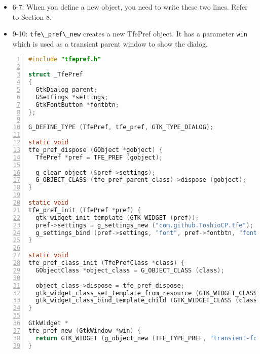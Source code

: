 \begin{itemize}
\tightlist
\item
  6-7: When you define a new object, you need to write these two lines.
  Refer to Section 8.
\item
  9-10: \passthrough{\lstinline!tfe\_pref\_new!} creates a new TfePref
  object. It has a parameter \passthrough{\lstinline!win!} which is used
  as a transient parent window to show the dialog.
\end{itemize}

\begin{lstlisting}[language=C, numbers=left]
#include "tfepref.h"

struct _TfePref
{
  GtkDialog parent;
  GSettings *settings;
  GtkFontButton *fontbtn;
};

G_DEFINE_TYPE (TfePref, tfe_pref, GTK_TYPE_DIALOG);

static void
tfe_pref_dispose (GObject *gobject) {
  TfePref *pref = TFE_PREF (gobject);

  g_clear_object (&pref->settings);
  G_OBJECT_CLASS (tfe_pref_parent_class)->dispose (gobject);
}

static void
tfe_pref_init (TfePref *pref) {
  gtk_widget_init_template (GTK_WIDGET (pref));
  pref->settings = g_settings_new ("com.github.ToshioCP.tfe");
  g_settings_bind (pref->settings, "font", pref->fontbtn, "font", G_SETTINGS_BIND_DEFAULT);
}

static void
tfe_pref_class_init (TfePrefClass *class) {
  GObjectClass *object_class = G_OBJECT_CLASS (class);

  object_class->dispose = tfe_pref_dispose;
  gtk_widget_class_set_template_from_resource (GTK_WIDGET_CLASS (class), "/com/github/ToshioCP/tfe/tfepref.ui");
  gtk_widget_class_bind_template_child (GTK_WIDGET_CLASS (class), TfePref, fontbtn);
}

GtkWidget *
tfe_pref_new (GtkWindow *win) {
  return GTK_WIDGET (g_object_new (TFE_TYPE_PREF, "transient-for", win, NULL));
}
\end{lstlisting}

